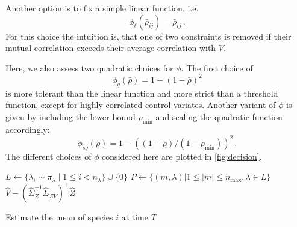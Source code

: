 Another option is to fix a simple linear function, i.e.\ \[
\phi_{\ell}(\bar\rho_{ij})=\bar\rho_{ij}\,.\]
For this choice the intuition is, that one of two constraints is
removed if their mutual
correlation exceeds their average correlation with $V$.

Here, we also assess two quadratic choices for $\phi$. The first choice of
\[
  \phi_{q}(\bar\rho)=1 - (1-\bar\rho)^2
\]
is more tolerant than the linear function and more strict than a
threshold function, except for
highly correlated control  variates.
Another variant of $\phi$ is given by including the lower bound
$\rho_{\min}$ and scaling
the quadratic function accordingly:
\[ \phi_{\mathit{sq}}(\bar\rho)=1-((1-\bar\rho)/(1-\rho_{\min}))^2\,.\]
The different choices of $\phi$ considered here are plotted in
\autoref{fig:decision}.
\begin{algorithm}[ht]
  $L\leftarrow\{\lambda_i\sim \pi_\lambda \mid 1\leq i< n_{\lambda}
  \} \cup \{ 0 \}$\label{line:lambda_sample}\;
  $P \leftarrow \{ ({m}, \lambda) | 1\leq\lvert {m} \rvert \leq
  n_{\max}, \lambda\in L\}$\label{line:init_covs}\;
  \Return $\hat{V} -
  {(\hat{\Sigma}_{{Z}}^{-1}\hat\Sigma_{{Z}V})}^{\top}\hat{{Z}}$\label{line:compute_lcv}\;
  \caption{\label{alg:ssa:lcv}Estimate the mean of species $i$ at time $T$}
\end{algorithm}
